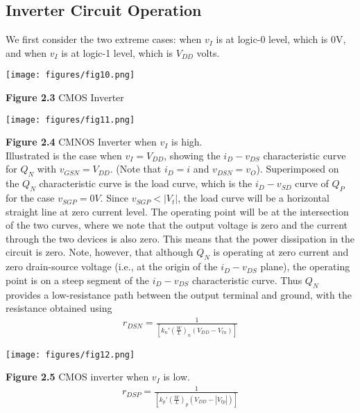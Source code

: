 \documentclass[12pt]{article}
\begin{document}
    \subsection*{Inverter Circuit Operation}

    We first consider the two extreme cases: when $v_I$ is at logic-0 level, which is 0V, and 
    when $v_I$ is at logic-1 level, which is $V_{DD}$ volts.

    \begin{center}
        \texttt{[image: figures/fig10.png]}
    \end{center}
    \textbf{Figure 2.3} CMOS Inverter

    \begin{center}
        \texttt{[image: figures/fig11.png]}
    \end{center}
    \textbf{Figure 2.4} CMNOS Inverter when $v_I$ is high.\\[\baselineskip]
    Illustrated is the case when $v_I = V_{DD}$, showing the $i_D-v_{DS}$ characteristic curve 
    for $Q_N$ with $v_{GSN} = V_{DD}$. (Note that $i_D = i$ and $v_{DSN} = v_O$). Superimposed 
    on the $Q_N$ characteristic curve is the load curve, which is the $i_D-v_{SD}$ curve of $Q_P$
    for the case $v_{SGP} = 0 V$. Since $v_{SGP} < |V_t|$, the load curve will be a horizontal 
    straight line at zero current level. The operating point will be at the intersection of the 
    two curves, where we note that the output voltage is zero and the current through the two 
    devices is also zero. This means that the power dissipation in the circuit is zero. Note, 
    however, that although $Q_N$ is operating at zero current and zero drain-source voltage 
    (i.e., at the origin of the $i_D-v_{DS}$ plane), the operating point is on a steep segment 
    of the $i_D-v_{DS}$ characteristic curve. Thus $Q_N$ provides a low-resistance path between 
    the output terminal and ground, with the resistance obtained using
    \begin{align}
        r_{DSN} = \frac{1}{[k_n'(\frac{W}{L})_n(V_{DD}-V_{tn})]}  
    \end{align}

    \begin{center}
        \texttt{[image: figures/fig12.png]}
    \end{center}
    \textbf{Figure 2.5} CMOS inverter when $v_I$ is low.\\
    
    \begin{align}
        r_{DSP} = \frac{1}{\left[k_p'(\frac{W}{L})_p(V_{DD}-|V_{tp}|)\right]}
    \end{align}
\end{document}
